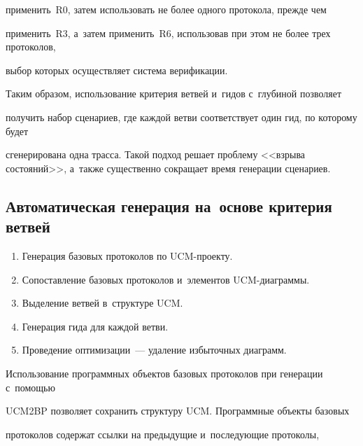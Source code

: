 применить~R0, затем использовать не более одного протокола, прежде чем


применить~R3, а~затем применить~R6, использовав при этом не более трех протоколов,


выбор которых осуществляет система верификации.





   Таким образом, использование критерия ветвей и~гидов с~глубиной позволяет


получить набор сценариев, где каждой ветви соответствует один гид, по которому будет


сгенерирована одна трасса. Такой подход решает проблему <<взрыва состояний>>, а~также существенно сокращает время генерации сценариев.





   \subsection{Автоматическая генерация на~основе критерия ветвей}





\noindent


\begin{enumerate}[1.]


\item Генерация базовых протоколов по UCM-проекту.


\item Сопоставление базовых протоколов и~элементов UCM-диаграммы.


\item Выделение ветвей в~структуре UCM.


\item Генерация гида для каждой ветви.


\item Проведение оптимизации~--- удаление избыточных диаграмм.


   \end{enumerate}





   Использование программных объектов базовых протоколов при генерации с~помощью


UCM2BP позволяет сохранить структуру UCM. Программные объекты базовых


протоколов содержат ссылки на предыдущие и~последующие протоколы,


